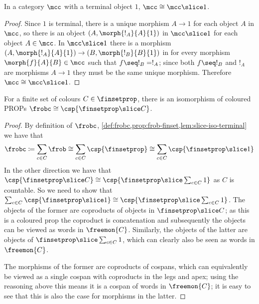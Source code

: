 \begin{lemma}
    \label{lem:slice-iso-terminal}
    In a category \(\mcc\) with a terminal object \(1\),
    \(\mcc \cong \mcc \slice 1\).
\end{lemma}
\begin{proof}
    Since \(1\) is terminal, there is a unique morphism \(A \to 1\) for each
    object \(A\) in \(\mcc\), so there is an object \((A, \morph{!_A}{A}{1})\)
    in \(\mcc \slice 1\) for each object \(A \in \mcc\).
    In \(\mcc \slice 1\) there is a morphism
    \((A, \morph{!_A}{A}{1}) \to (B, \morph{!_B}{B}{1})\) in
    for every morphism \(\morph{f}{A}{B} \in \mcc\) such
    that \(f \seq !_B = !_A\); since both \(f \seq !_B\) and \(!_A\) are
    morphisms \(A \to 1\) they must be the same unique morphism.
    Therefore \(\mcc \cong \mcc \slice 1\).
\end{proof}

\begin{theorem}
    \label{thm:frobc-iso-finset-slice-c}
    For a finite set of colours \(C \in \finsetprop\), there is an isomorphism
    of coloured PROPs \(\frobc \cong \csp{\finsetprop \slice C}\).
\end{theorem}
\begin{proof}
    By definition of \(\frobc\),
    \cref{def:frobc,prop:frob-finset,lem:slice-iso-terminal}
    we have that \[
        \frobc
        \coloneqq
        \sum_{c \in C}\frob
        \cong
        \sum_{c \in C}\csp{\finsetprop}
        \cong
        \sum_{c \in C}\csp{\finsetprop \slice 1}
    \]
    In the other direction we have that \(
        \csp{\finsetprop \slice C}
        \cong
        \csp{\finsetprop \slice \sum_{c \in C} 1}
    \) as \(C\) is countable.
    So we need to show that \(
        \sum_{c \in C}\csp{\finsetprop \slice 1}
        \cong
        \csp{\finsetprop \slice \sum_{c \in C} 1}
    \).
    The objects of the former are coproducts of objects in
    \(\finsetprop \slice C\); as this is a coloured prop the coproduct is
    concatenation and subsequently the objects can be viewed as words in
    \(\freemon{C}\).
    Similarly, the objects of the latter are objects of
    \(\finsetprop \slice \sum_{c \in C} 1\), which can clearly also be
    seen as words in \(\freemon{C}\).

    The morphisms of the former are coproducts of cospans, which can
    equivalently be viewed as a single cospan with coproducts in the legs and
    apex; using the reasoning above this means it is a cospan of words in
    \(\freemon{C}\); it is easy to see that this is also the case for morphisms
    in the latter.
\end{proof}

